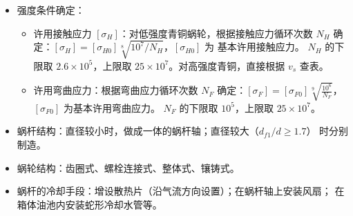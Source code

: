 \documentclass[12pt,a4paper]{article}
\newcommand{\tightlist}{\setlength{\parskip}{0pt}\setlength{\itemsep}{0pt}}
\newcommand{\hint}[1]{\textsf{（#1）}}
\newcommand{\minor}[1]{{\color{gray} #1}}
\begin{document}
\begin{itemize}
\begin{itemize}
\begin{equation}
        \end{equation}
        设计公式为
        \begin{equation}
        m^2d_1\geq\frac{2000KT_2Y_{Fa2}}{z_2[\sigma_F]\cos\gamma}.
        \end{equation}
        其中的齿形系数 $Y_{Fa2}$ 可按当量齿数 $z_{v2}=\frac{z_2}{\cos^3\gamma}$
        查表。
        \item 热平衡计算：验算温升
        \begin{equation}
        \Delta t=\frac{1000P(1-\eta)}{K_tA}\leq[\Delta t]
        \end{equation}
        其中 $P$ 为功率，$A$ 为散热面积\hint{一般估计为散热片表面积的一半}，$K_t$ 为
        散热系数\hint{ 一般取 10 -- \SI{17}{J/(n^2.s.\celsius)}}；许用温升 $[\Delta
        t]$ 为 30 -- \SI{40}\celsius，且油温应小于 \SI{80}\celsius。
    \end{itemize}
    \item 强度条件确定：
    \begin{itemize}\tightlist
        \item 许用接触应力 $[\sigma_H]$：对低强度青铜蜗轮，根据接触应力循环次数 $N_H$
        确定：$[\sigma_H]=[\sigma_{H0}]\sqrt[8]{10^7/N_H}$，$[\sigma_{H0}]$ 为
        基本许用接触应力。\minor{$N_H$ 的下限取 $2.6\times10^5$，上限取 $25\times
        10^7$。}对高强度青铜，直接根据 $v_s$ 查表。
        \item 许用弯曲应力：根据弯曲应力循环次数 $N_F$ 确定：$[\sigma_F]=[\sigma_{F0}]
        \sqrt[9]{\frac{10^6}{N_F}}$，$[\sigma_{F0}]$ 为基本许用弯曲应力。\minor{
        $N_F$ 的下限取 $10^5$，上限取 $25\times10^7$。}
    \end{itemize}
    \item 蜗杆结构：直径较小时，做成一体的蜗杆轴；直径较大\hint{$d_{f1}/d\geq1.7$}
    时分别制造。
    \item \minor{蜗轮结构：齿圈式、螺栓连接式、整体式、镶铸式。}
    \item \minor{蜗杆的冷却手段：增设散热片\hint{沿气流方向设置}；在蜗杆轴上安装风扇；
    在箱体油池内安装蛇形冷却水管等。}
\end{itemize}
\end{document}

